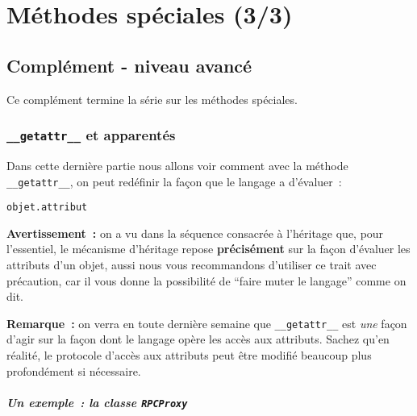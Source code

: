     
    
    
    

    

    \hypertarget{muxe9thodes-spuxe9ciales-33}{%
\section{Méthodes spéciales (3/3)}\label{muxe9thodes-spuxe9ciales-33}}

    \hypertarget{compluxe9ment---niveau-avancuxe9}{%
\subsection{Complément - niveau
avancé}\label{compluxe9ment---niveau-avancuxe9}}

    Ce complément termine la série sur les méthodes spéciales.

    \hypertarget{getattr__-et-apparentuxe9s}{%
\subsubsection{\texorpdfstring{\texttt{\_\_getattr\_\_} et
apparentés}{\_\_getattr\_\_ et apparentés}}\label{getattr__-et-apparentuxe9s}}

    Dans cette dernière partie nous allons voir comment avec la méthode
\texttt{\_\_getattr\_\_}, on peut redéfinir la façon que le langage a
d'évaluer~:

\begin{verbatim}
objet.attribut
\end{verbatim}

    \textbf{Avertissement~:} on a vu dans la séquence consacrée à l'héritage
que, pour l'essentiel, le mécanisme d'héritage repose
\textbf{précisément} sur la façon d'évaluer les attributs d'un objet,
aussi nous vous recommandons d'utiliser ce trait avec précaution, car il
vous donne la possibilité de ``faire muter le langage'' comme on dit.

    \textbf{Remarque~:} on verra en toute dernière semaine que
\texttt{\_\_getattr\_\_} est \emph{une} façon d'agir sur la façon dont
le langage opère les accès aux attributs. Sachez qu'en réalité, le
protocole d'accès aux attributs peut être modifié beaucoup plus
profondément si nécessaire.

    \hypertarget{un-exemple-la-classe-rpcproxy}{%
\subparagraph{\texorpdfstring{Un exemple~: la classe
\texttt{RPCProxy}}{Un exemple~: la classe RPCProxy}}\label{un-exemple-la-classe-rpcproxy}}

